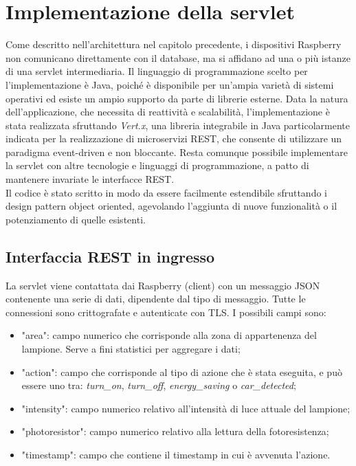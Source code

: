 \section{Implementazione della servlet \label{serv-impl}}
Come descritto nell'architettura nel capitolo precedente, i dispositivi Raspberry non comunicano direttamente con il database, ma si affidano ad una o più istanze di una servlet intermediaria.
Il linguaggio di programmazione scelto per l'implementazione è Java, poiché è disponibile per un'ampia varietà di sistemi operativi ed esiste un ampio supporto da parte di librerie esterne.
Data la natura dell'applicazione, che necessita di reattività e scalabilità, l'implementazione è stata realizzata sfruttando \textit{Vert.x}, una libreria integrabile in Java particolarmente indicata per la realizzazione di microservizi REST, che consente di utilizzare un paradigma event-driven e non bloccante.
Resta comunque possibile implementare la servlet con altre tecnologie e linguaggi di programmazione, a patto di mantenere invariate le interfacce REST.
\\Il codice è stato scritto in modo da essere facilmente estendibile sfruttando i design pattern object oriented, agevolando l'aggiunta di nuove funzionalità o il potenziamento di quelle esistenti.

\subsection{Interfaccia REST in ingresso \label{serv-rest-in}}
La servlet viene contattata dai Raspberry (client) con un messaggio JSON contenente una serie di dati, dipendente dal tipo di messaggio. Tutte le connessioni sono crittografate e autenticate con TLS.
I possibili campi sono:
\begin{itemize}
 \item "area": campo numerico che corrisponde alla zona di appartenenza del lampione. Serve a fini statistici per aggregare i dati;
 \item "action": campo che corrisponde al tipo di azione che è stata eseguita, e può essere uno tra: \textit{turn\_on}, \textit{turn\_off}, \textit{energy\_saving} o \textit{car\_detected};
 \item "intensity": campo numerico relativo all'intensità di luce attuale del lampione;
 \item "photoresistor": campo numerico relativo alla lettura della fotoresistenza;
 \item "timestamp": campo che contiene il timestamp in cui è avvenuta l'azione.
\end{itemize}

